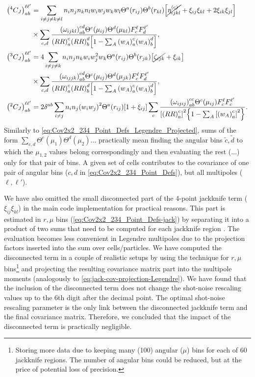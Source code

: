 \begin{align} \label{eq:Cov2x2_234_Point_Defs-jack-legendre}
\qty(^4C_J)_{ab}^{\ell\ell'} &= \sum_{i\neq j\neq k\neq l} n_i n_j n_k n_l w_i w_j w_k w_l \Theta^a(r_{ij}) \Theta^b(r_{kl}) \qty[\cancel{\eta^{({\rm c})}_{ijkl}} + \xi_{ij} \xi_{kl} + 2\xi_{ik} \xi_{jl}] \\ \nonumber
& \times \sum_{c,d} \frac{\qty(\omega_{ijkl})_{ab}^{cd} \Theta^c(\mu_{ij}) \Theta^d(\mu_{kl}) F^\ell_c F^{\ell'}_d}{\qty(RR)_a^c \qty(RR)_b^d \qty[1 - \sum_A \qty(w_A)_a^c \qty(w_A)_b^d]}, \\ \nonumber
\qty(^3C_J)_{ab}^{\ell\ell'} &= 4 \sum_{i\neq j\neq k} n_i n_j n_k w_i w_j^2 w_k \Theta^a(r_{ij}) \Theta^b(r_{jk}) \qty[\cancel{\zeta_{ijk}} + \xi_{ik}] \\ \nonumber
& \times \sum_{c,d} \frac{\qty(\omega_{ijjk})_{ab}^{cd} \Theta^c(\mu_{ij}) \Theta^d(\mu_{jk}) F^\ell_c F^{\ell'}_d}{\qty(RR)_a^c \qty(RR)_b^d \qty[1 - \sum_A \qty(w_A)_a^c \qty(w_A)_b^d]}, \\ \nonumber
\qty(^2C_J)_{ab}^{\ell\ell'} &= 2\delta^{ab} \sum_{i\neq j} n_i n_j \qty(w_i w_j)^2 \Theta^a(r_{ij}) \qty[1+\xi_{ij}] \sum_c \frac{\qty(\omega_{ijij})_{ab}^{cc} \Theta^c(\mu_{ij}) F^\ell_c F^{\ell'}_c}{\qty[\qty(RR)_a^c]^2 \qty{1 - \sum_A \qty[\qty(w_A)_a^c]^2}}.
\end{align}
Similarly to \cref{eq:Cov2x2_234_Point_Defs_Legendre_Projected}, sums of the form $\sum_{c,d} \Theta^c(\mu_1) \Theta^d(\mu_2) \dots$ practically mean finding the angular bins $\tilde c,\tilde d$ to which the $\mu_{1,2}$ values belong correspondingly and then evaluating the rest ($\dots$) only for that pair of bins.
A given set of cells contributes to the covariance of one pair of angular bins ($c,d$ in \cref{eq:Cov2x2_234_Point_Defs}), but all multipoles ($\ell,\ell'$).

We have also omitted the small disconnected part of the 4-point jackknife term ($\xi_{ij} \xi_{kl}$) in the main code implementation for practical reasons.
This part is estimated in $r,\mu$ bins (\cref{eq:Cov2x2_234_Point_Defs-jack}) by separating it into a product of two sums that need to be computed for each jackknife region \citep{rascalC}.
The evaluation becomes less convenient in Legendre multipoles due to the projection factors inserted into the sum over cells/particles.
We have computed the disconnected term in a couple of realistic setups by using the technique for $r,\mu$ bins\footnote{Storing more data due to keeping many (100) angular ($\mu$) bins for each of 60 jackknife regions. The number of angular bins could be reduced, but at the price of potential loss of precision.} and projecting the resulting covariance matrix part into the multipole moments (analogously to \cref{eq:jack-cov-projection-Legendre}).
We have found that the inclusion of the disconnected term does not change the shot-noise rescaling values up to the 6th digit after the decimal point.
The optimal shot-noise rescaling parameter is the only link between the disconnected jackknife term and the final covariance matrix.
Therefore, we concluded that the impact of the disconnected term is practically negligible.

